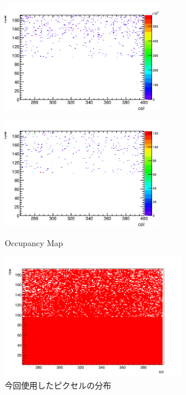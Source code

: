 \begin{figure}[h]
  \centering
  \begin{minipage}[b]{0.45\linewidth}
    \centering
    \includegraphics[width=7cm]{./figure/Noisebf.png}
    \label{fig:bfnoise}
  \end{minipage}
  \begin{minipage}[b]{0.45\linewidth}
    \centering
    \includegraphics[width=7cm]{./figure/Noiseaf.png}
    \label{fig:afnoise}
  \end{minipage}
  \caption{Occupancy Map}
  \label{fig:NoiseOcc}
\end{figure}

\begin{figure}[h]
  \centering
  \includegraphics[width=8cm]{./figure/EnablePix.png}
  \caption{今回使用したピクセルの分布}
  \label{fig:enablepix}
\end{figure}


